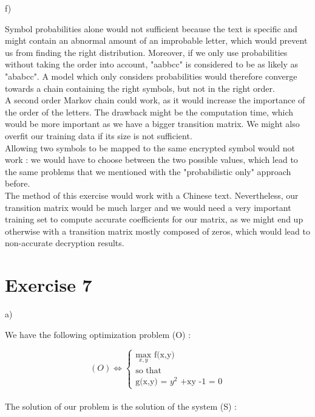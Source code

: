 \documentclass[12pt,a4paper]{report} %
\begin{document}
\item f)

Symbol probabilities alone would not sufficient because the text is specific and might contain an abnormal amount of an improbable letter, which would prevent us from finding the right distribution. Moreover, if we only use probabilities without taking the order into account, "aabbcc" is considered to be as likely as "ababcc". A model which only considers probabilities would therefore converge towards a chain containing the right symbols, but not in the right order. \\

A second order Markov chain could work, as it would increase the importance of the order of the letters. The drawback might be the computation time, which would be more important as we have a bigger transition matrix. We might also overfit our training data if its size is not sufficient.\\

Allowing two symbols to be mapped to the same encrypted symbol would not work : we would have to choose between the two possible values, which lead to the same problems that we mentioned with the "probabilistic only" approach before.\\ 

The method of this exercise would work with a Chinese text. Nevertheless, our transition matrix would be much larger and we would need a very important training set to compute accurate coefficients for our matrix, as we might end up otherwise with a transition matrix mostly composed of zeros, which would lead to non-accurate decryption results.\\


\chapter{Exercise 7}

\item a)

We have the following optimization problem (O) : 

\[
(O) \Leftrightarrow \left\{
\begin{array}{l}
\text{$\max_{x,y}$ f(x,y)} \\
\text{so that}\\
\text{g(x,y) = $y^2$ +xy -1 = 0}
\end{array}
\right.
\] \\


The solution of our problem is the solution of the system (S) : 
\end{document}
